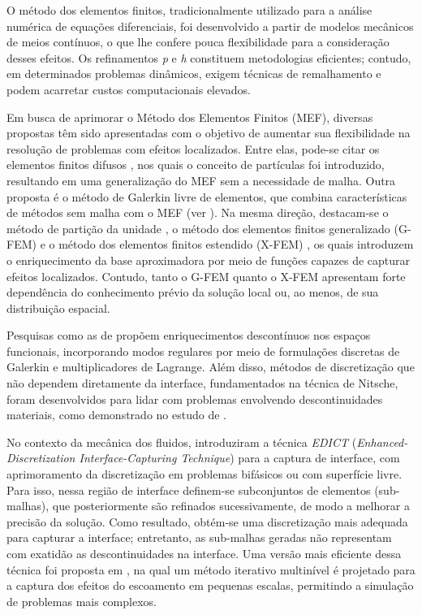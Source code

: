 O método dos elementos finitos, tradicionalmente utilizado para a análise numérica de equações diferenciais, foi desenvolvido a partir de modelos mecânicos de meios contínuos, o que lhe confere pouca flexibilidade para a consideração desses efeitos. Os refinamentos \textit{p} e \textit{h} constituem metodologias eficientes; contudo, em determinados problemas dinâmicos, exigem técnicas de remalhamento e podem acarretar custos computacionais elevados.

Em busca de aprimorar o Método dos Elementos Finitos (MEF), diversas propostas têm sido apresentadas com o objetivo de aumentar sua flexibilidade na resolução de problemas com efeitos localizados. Entre elas, pode-se citar os elementos finitos difusos \cite{NayrolesTV:1992}, nos quais o conceito de partículas foi introduzido, resultando em uma generalização do MEF sem a necessidade de malha. Outra proposta é o método de Galerkin livre de elementos, que combina características de métodos sem malha com o MEF (ver ). Na mesma direção, destacam-se o método de partição da unidade \cite{MelenkB:1996}, o método dos elementos finitos generalizado (G-FEM) \cite{StrouboulisCB:2001} e o método dos elementos finitos estendido (X-FEM) \cite{Moes:2003}, os quais introduzem o enriquecimento da base aproximadora por meio de funções capazes de capturar efeitos localizados. Contudo, tanto o G-FEM quanto o X-FEM apresentam forte dependência do conhecimento prévio da solução local ou, ao menos, de sua distribuição espacial.

Pesquisas como as de  propõem enriquecimentos descontínuos nos espaços funcionais, incorporando modos regulares por meio de formulações discretas de Galerkin e multiplicadores de Lagrange. Além disso, métodos de discretização que não dependem diretamente da interface, fundamentados na técnica de Nitsche, foram desenvolvidos para lidar com problemas envolvendo descontinuidades materiais, como demonstrado no estudo de .

No contexto da mecânica dos fluidos,  introduziram a técnica \textit{EDICT} (\textit{Enhanced-Discretization Interface-Capturing Technique}) para a captura de interface, com aprimoramento da discretização em problemas bifásicos ou com superfície livre. Para isso, nessa região de interface definem-se subconjuntos de elementos (sub-malhas), que posteriormente são refinados sucessivamente, de modo a melhorar a precisão da solução. Como resultado, obtém-se uma discretização mais adequada para capturar a interface; entretanto, as sub-malhas geradas não representam com exatidão as descontinuidades na interface. Uma versão mais eficiente dessa técnica foi proposta em , na qual um método iterativo multinível é projetado para a captura dos efeitos do escoamento em pequenas escalas, permitindo a simulação de problemas mais complexos.

